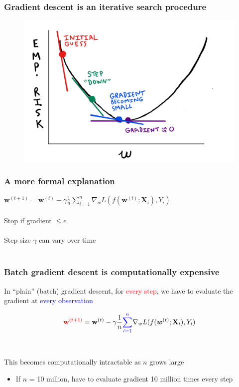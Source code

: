 \documentclass{beamer}
\begin{document}
\begin{frame}
	\frametitle{Gradient descent is an iterative search procedure}
	\begin{figure}[h]
	\centering
	\includegraphics[scale=0.33]{Sketch}
	\end{figure}
\end{frame}

\begin{frame}
	\frametitle{A more formal explanation}

	$\mathbf{w}^{(t+1)} = \mathbf{w}^{(t)} - \gamma \frac{1}{n}\sum_{i=1}^n
	\nabla_w L(f(\bm{w}^{(t)}; \mathbf{X}_i), Y_i)$ \\~\\

	Stop if gradient $\leq \epsilon$ \\~\\

	Step size $\gamma$ can vary over time \\~\\

\end{frame}

\begin{frame}
	\frametitle{Batch gradient descent is computationally expensive}
	In ``plain'' (batch) gradient descent, for \textcolor{red}{every step}, 
	we have to evaluate the gradient at \textcolor{blue} {every observation}

	$$
	\textcolor{red}{\mathbf{w}^{(t+1)}} = \mathbf{w}^{(t)} - \gamma \frac{1}{n}
	\textcolor{blue}{\sum_{i=1}^n}
	\nabla_w L(f(\bm{w}^{(t)}; \mathbf{X}_i), Y_i)
	$$\\~\\

	This becomes computationally intractable as $n$ grows large 
	\begin{itemize}
		\item \small If $n$ = 10 million, have to evaluate 
			gradient 10 million times every step
	\end{itemize}
\end{frame}
\end{document}
